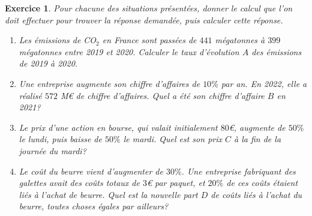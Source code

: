 \documentclass[11pt,a4paper]{exam}
\newtheorem{exo}{Exercice}
\begin{document}
\begin{exo}
    Pour chacune des situations présentées, donner le calcul que l'on doit effectuer pour trouver la réponse demandée, puis calculer cette réponse. 
    \begin{enumerate}
    \item Les émissions de CO$_2$ en France sont passées de $441$ mégatonnes à $399$ mégatonnes entre 2019 et 2020. Calculer le taux d'évolution $A$ des émissions de 2019 à 2020.\newline
    \item Une entreprise augmente son chiffre d'affaires de $10\%$ par an. En 2022, elle a réalisé $572$ M€ de chiffre d'affaires. Quel a été son chiffre d'affaire $B$ en 2021?\newline
    \item Le prix d'une action en bourse, qui valait initialement $80$€, augmente de $50\%$ le lundi, puis baisse de $50\%$ le mardi. Quel est son prix $C$ à la fin de la journée du mardi? \newline
    \item Le coût du beurre vient d'augmenter de $30\%$. Une entreprise fabriquant des galettes avait des coûts totaux de $3$€ par paquet, et $20\%$ de ces coûts étaient liés à l'achat de beurre. Quel est la nouvelle part $D$ de coûts liés à l'achat du beurre, toutes choses égales par ailleurs?  \newline
    \end{enumerate}
\end{exo}
\vspace{1cm}
\end{document}
